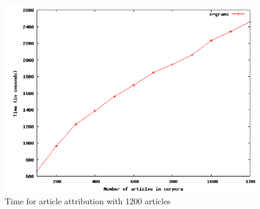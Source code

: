 \begin{figure}[!hbp]
\includegraphics[width=\textwidth]{tabeller/work.png}
\caption{Time for article attribution with 1200 articles \label{fig:work}}
\end{figure}
